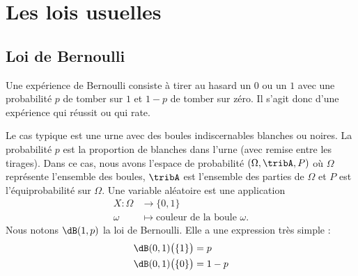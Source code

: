 
\section{Les lois usuelles}

\subsection{Loi de Bernoulli}

Une expérience de Bernoulli consiste à tirer au hasard un \( 0\) ou un \( 1\) avec une probabilité \( p\) de tomber sur \( 1\) et \( 1-p\) de tomber sur zéro. Il s'agit donc d'une expérience qui réussit ou qui rate.

Le cas typique est une urne avec des boules indiscernables blanches ou noires. La probabilité \( p\) est la proportion de blanches dans l'urne (avec remise entre les tirages). Dans ce cas, nous avons l'espace de probabilité \( (\Omega,\tribA,P)\) où \( \Omega\) représente l'ensemble des boules, \( \tribA\) est l'ensemble des parties de \( \Omega\) et \( P\) est l'équiprobabilité sur \( \Omega\). Une variable aléatoire est une application
\begin{equation}
	\begin{aligned}
		X\colon \Omega & \to \{ 0,1 \}                               \\
		\omega         & \mapsto \text{couleur de la boule } \omega.
	\end{aligned}
\end{equation}
Nous notons \( \dB(1,p)\) la loi de Bernoulli. Elle a une expression très simple :
\begin{subequations}
	\begin{align}
		\dB(0,1)\big( \{ 1 \} \big) & =p   \\
		\dB(0,1)\big( \{ 0 \} \big) & =1-p
	\end{align}
\end{subequations}

